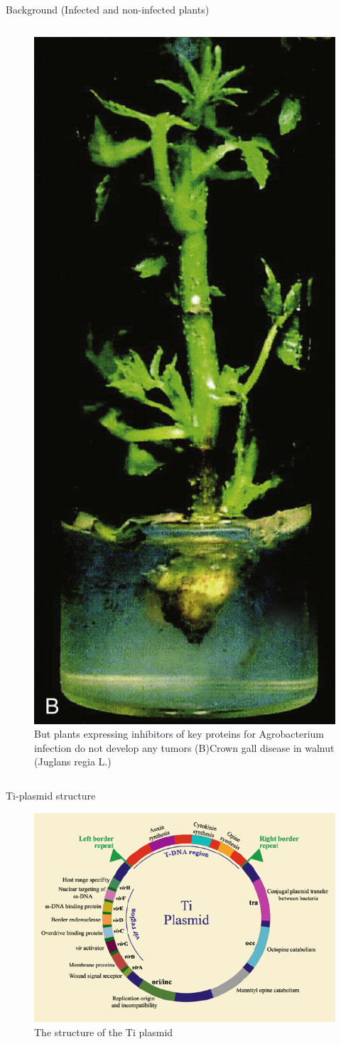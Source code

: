 \documentclass[
  ignorenonframetext,
  aspectratio=169]{beamer}
\begin{document}
\begin{frame}{Background (Infected and non-infected plants)}
\begin{columns}[T,onlytextwidth]
\begin{figure}
\includegraphics[width=0.4\linewidth]{../images/agrobacterium_gall_b} \caption{But plants expressing inhibitors of key proteins for Agrobacterium infection do not develop any tumors (B)\newline Crown gall disease in walnut (Juglans regia L.)}\label{fig:agrobacterium-gall2}
\end{figure}
    
\end{columns}
\end{frame}

\begin{frame}{Ti-plasmid structure}
\protect\hypertarget{ti-plasmid-structure}{}
\begin{figure}
\includegraphics[width=0.5\linewidth]{../images/Ti_plasmid} \caption{The structure of the Ti plasmid}\label{fig:ti-plasmid}
\end{figure}
\end{frame}
\end{document}
